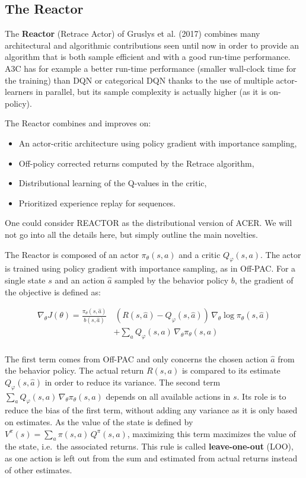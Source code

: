 \documentclass[
  letterpaper,
  DIV=11,
  numbers=noendperiod]{scrreprt}
\providecommand{\tightlist}{%
  \setlength{\itemsep}{0pt}\setlength{\parskip}{0pt}}\usepackage{longtable,booktabs,array}
\begin{document}
\hypertarget{the-reactor}{%
\subsection{The Reactor}\label{the-reactor}}

The \textbf{Reactor} (Retrace Actor) of Gruslys et al. (2017) combines
many architectural and algorithmic contributions seen until now in order
to provide an algorithm that is both sample efficient and with a good
run-time performance. A3C has for example a better run-time performance
(smaller wall-clock time for the training) than DQN or categorical DQN
thanks to the use of multiple actor-learners in parallel, but its sample
complexity is actually higher (as it is on-policy).

The Reactor combines and improves on:

\begin{itemize}
\tightlist
\item
  An actor-critic architecture using policy gradient with importance
  sampling,
\item
  Off-policy corrected returns computed by the Retrace algorithm,
\item
  Distributional learning of the Q-values in the critic,
\item
  Prioritized experience replay for sequences.
\end{itemize}

One could consider REACTOR as the distributional version of ACER. We
will not go into all the details here, but simply outline the main
novelties.

The Reactor is composed of an actor \(\pi_\theta(s, a)\) and a critic
\(Q_\varphi(s, a)\). The actor is trained using policy gradient with
importance sampling, as in Off-PAC. For a single state \(s\) and an
action \(\hat{a}\) sampled by the behavior policy \(b\), the gradient of
the objective is defined as:

\[
\begin{aligned}
    \nabla_\theta J(\theta) = \frac{\pi_\theta(s, \hat{a})}{b(s, \hat{a})} & \, (R(s, \hat{a}) - Q_\varphi(s, \hat{a})) \, \nabla_\theta \log \pi_\theta(s, \hat{a}) \\
    & + \sum_a Q_\varphi(s, a) \, \nabla_\theta \pi_\theta(s, a) \\
\end{aligned}
\]

The first term comes from Off-PAC and only concerns the chosen action
\(\hat{a}\) from the behavior policy. The actual return \(R(s, a)\) is
compared to its estimate \(Q_\varphi(s, \hat{a})\) in order to reduce
its variance. The second term
\(\sum_a Q_\varphi(s, a) \, \nabla_\theta \pi_\theta(s, a)\) depends on
all available actions in \(s\). Its role is to reduce the bias of the
first term, without adding any variance as it is only based on
estimates. As the value of the state is defined by
\(V^\pi(s) = \sum_a \pi(s, a) \, Q^\pi(s, a)\), maximizing this term
maximizes the value of the state, i.e.~the associated returns. This rule
is called \textbf{leave-one-out} (LOO), as one action is left out from
the sum and estimated from actual returns instead of other estimates.
\end{document}

